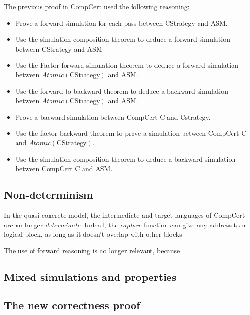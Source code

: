 The previous proof in CompCert used the following reasoning:
\begin{itemize}
\item Prove a forward simulation for each pass between CStrategy and ASM.
\item Use the simulation composition theorem to deduce a forward simulation between CStrategy and ASM
\item Use the Factor forward simulation theorem to deduce a forward simulation between $\mathit{Atomic}(\text{CStrategy})$ and ASM.
\item Use the forward to backward theorem to deduce a backward simulation between $\mathit{Atomic}(\text{CStrategy})$ and ASM.
\item Prove a bacward simulation between CompCert C and Cstrategy.
\item Use the factor backward theorem to prove a simulation between CompCert C and $\mathit{Atomic}(\text{CStrategy})$.
\item Use the simulation composition theorem to deduce a backward simulation between CompCert C and ASM.
\end{itemize}

\subsection{Non-determinism}
In the quasi-concrete model, the intermediate and target languages of CompCert are no longer \textit{determinate}. Indeed, the \textit{capture} function can give any address to a logical block, as long as it doesn't overlap with other blocks.

The use of forward reasoning is no longer relevant, because 

\subsection{Mixed simulations and properties}
\subsection{The new correctness proof}
